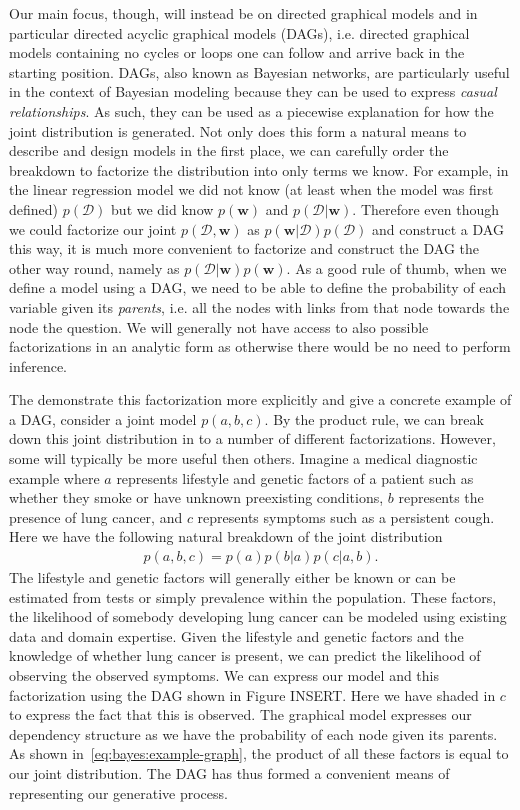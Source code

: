 Our main focus, though, will instead be on directed graphical models and in particular directed acyclic 
graphical models (DAGs), i.e. directed graphical models containing no cycles or loops one can follow 
and arrive back in the starting position.  DAGs, also known as Bayesian networks, are particularly
useful in the context of Bayesian modeling because they can be used to express \emph{casual relationships}.
As such, they can be used as a piecewise explanation for how the joint distribution is generated.
Not only does this form a natural means to describe and design models in the first place, 
we can carefully order the breakdown to factorize the distribution into only terms we know.  For example,
in the linear regression model we did not know (at least when the model was first defined) 
$p(\mathcal{D})$ but we did know $p(\mathbf{w})$ and $p(\mathcal{D} | \mathbf{w})$.  Therefore even
though we could factorize our joint $p(\mathcal{D}, \mathbf{w})$ as 
$p(\mathbf{w} | \mathcal{D})p(\mathcal{D})$ and construct a DAG this way, it is much more convenient
to factorize and construct the DAG the other way round, namely as 
$p(\mathcal{D} | \mathbf{w})p(\mathbf{w})$.
As a good rule of thumb, when we define a model using a DAG, we need to be able to define the 
probability of each variable given its \emph{parents}, i.e. all the nodes with links from that node
towards the node the question.  We will generally not have access to also possible factorizations
in an analytic form as otherwise there would be no need to perform inference.

The demonstrate this factorization more explicitly and give a concrete example of a DAG, consider a joint model
$p(a,b,c)$.  By the product rule, we can break down this joint distribution in to a number of different
factorizations.  However, some will typically be more useful then others.  Imagine a medical diagnostic
example where $a$ represents lifestyle and genetic factors of a patient such as whether they smoke
or have unknown preexisting conditions, 
$b$ represents the presence of lung cancer, and $c$ represents symptoms 
such as a persistent cough.  Here we have the following natural breakdown of the joint distribution
\begin{align}
\label{eq:bayes:example-graph}
p(a,b,c) = p(a) p(b|a) p(c|a,b).
\end{align}
The lifestyle and genetic factors will generally either be known or can be estimated from tests or
simply prevalence within the population.  These factors, the likelihood of somebody developing
lung cancer can be modeled using existing data and domain expertise.   Given the lifestyle and
genetic factors and the knowledge of whether lung cancer is present, we can predict the likelihood
of observing the observed symptoms.  We can express our model and this factorization using
the DAG shown in Figure INSERT.
  Here we have shaded in $c$ to express the fact that this is
observed.  The graphical model expresses our dependency structure as we have the probability
of each node given its parents.  As shown in~\eqref{eq:bayes:example-graph}, the product of
all these factors is equal to our joint distribution.  The DAG has thus formed a convenient means
of representing our generative process.

